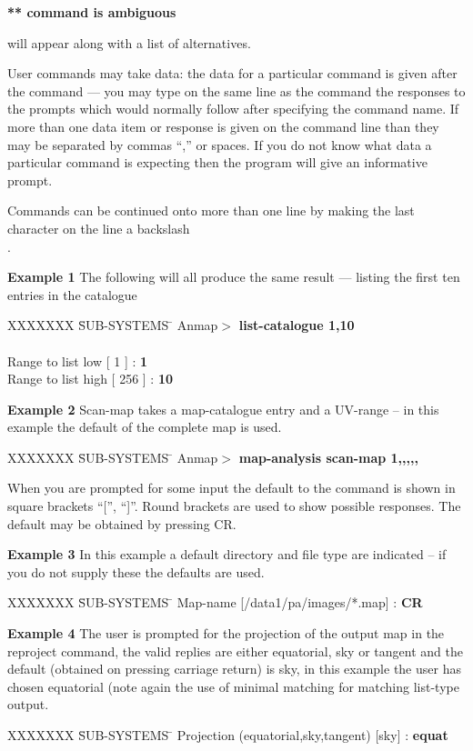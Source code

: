 {\bf *** command is ambiguous}

 will appear along with a list of alternatives.
 
User commands may take data: the data for a
particular command is given after the command --- you may type on
the same line as the command the responses to the prompts
which would normally follow after specifying the command name.
If more than one data item or response is given on the command
line than they may be separated by commas ``,'' or spaces. If
you do not know what data a particular command is expecting
then the program will give an informative prompt.

Commands can be continued onto more than one line by making the last 
character on the line a backslash \\.

{\bf Example 1}
The following will all produce the same result --- listing the first
ten entries in the catalogue
\begin{tabbing}
XXXXXXX \= SUB-SYSTEMS \= \kill
\> Anmap$>$ {\bf list-catalogue 1,10} \\
\\
\> Range to list low  [ 1 ] : {\bf 1} \\
\> Range to list high  [ 256 ] : {\bf 10} \\
\end{tabbing}

{\bf Example 2} 
Scan-map takes a map-catalogue entry and a UV-range -- in this
example the default of the complete map is used.
\begin{tabbing}
XXXXXXX \= SUB-SYSTEMS \= \kill
\> Anmap$>$ {\bf map-analysis scan-map 1,,,,,}
\end{tabbing}


When you are prompted for some input the default to the
command is shown in square brackets ``['', ``]''. Round brackets
are used to show possible responses. The default may be
obtained by pressing CR.

{\bf Example 3}
In this example a default directory and file type are
indicated -- if you do not supply these the defaults are used.
\begin{tabbing}
XXXXXXX \= SUB-SYSTEMS \= \kill
\> Map-name [/data1/pa/images/*.map] : {\bf CR} 
\end{tabbing}


{\bf Example 4}
The user is prompted for the projection of the output map in
the reproject command, the valid replies are either
equatorial, sky or tangent and the default (obtained on
pressing carriage return) is sky, in this example the user has
chosen equatorial (note again the use of minimal matching for matching
list-type output.
\begin{tabbing}
XXXXXXX \= SUB-SYSTEMS \= \kill
\> Projection (equatorial,sky,tangent) [sky] : {\bf equat}
\end{tabbing}
 
